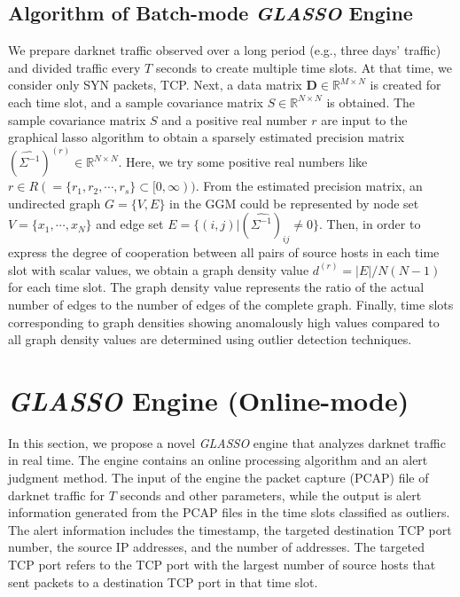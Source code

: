 \documentclass[conference]{IEEEtran}
\begin{document}
\subsection{Algorithm of Batch-mode \textit{GLASSO} Engine}
\label{Batch}
We prepare darknet traffic observed over a long period (e.g., three days' traffic) and divided traffic every $T$ seconds to create multiple time slots.
At that time, we consider only SYN packets, TCP.
Next, a data matrix $\bm{D}\in\mathbb{R}^{M \times N}$ is created for each time slot, and a sample covariance matrix $S\in\mathbb{R}^{N \times N}$ is obtained.
The sample covariance matrix $S$ and a positive real number $r$ are input to the graphical lasso algorithm to obtain a sparsely estimated precision matrix ${(\hat{\Sigma^{-1}})}^{(r)}\in\mathbb{R}^{N \times N}$.
Here, we try some positive real numbers like $r \in R ( = \{r_1, r_2, \cdots, r_s\} \subset [0,\infty))$.
From the estimated precision matrix, an undirected graph $G = \{V, E\}$ in the GGM could be represented by node set $V=\{x_{1}, \cdots, x_{N}\}$ and edge set $E=\{(i,j)|{(\hat{\Sigma^{-1}})}_{ij}\neq0\}$.
Then, in order to express the degree of cooperation between all pairs of source hosts in each time slot with scalar values, we obtain a graph density value $d^{(r)}=|E|/N(N-1)$ for each time slot.
The graph density value represents the ratio of the actual number of edges to the number of edges of the complete graph.
Finally, time slots corresponding to graph densities showing anomalously high values compared to all graph density values are determined using outlier detection techniques.




\section{\textit{GLASSO} Engine (Online-mode)}
\label{GLASSO}
In this section, we propose a novel \textit{GLASSO} engine that analyzes darknet traffic in real time.
The engine contains an online processing algorithm and an alert judgment method.
The input of the engine the packet capture (PCAP) file of darknet traffic for $T$ seconds and other parameters, while the output is alert information generated from the PCAP files in the time slots classified as outliers.
The alert information includes the timestamp, the targeted destination TCP port number, the source IP addresses, and the number of addresses.
The targeted TCP port refers to the TCP port with the largest number of source hosts that sent packets to a destination TCP port in that time slot.
\end{document}
